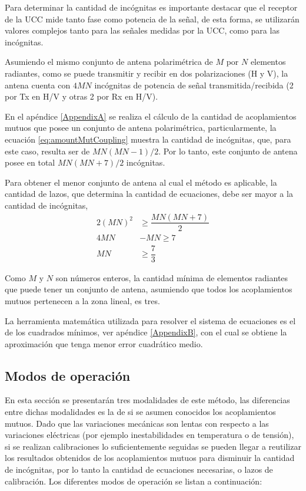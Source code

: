 Para determinar la cantidad de incógnitas es importante destacar que el receptor de la UCC mide tanto fase como potencia de la
señal, de esta forma, se utilizarán valores complejos tanto para las señales medidas por la UCC, como para las incógnitas.

Asumiendo el mismo conjunto de antena polarimétrica de $M$ por $N$ elementos radiantes, como se puede transmitir y recibir en
dos polarizaciones (H y V), la antena cuenta con $4MN$ incógnitas de potencia de señal transmitida/recibida (2 por Tx en H/V y
otras 2 por Rx en H/V).

En el apéndice \ref{AppendixA} se realiza el cálculo de la cantidad de acoplamientos mutuos que posee un conjunto de antena
polarimétrica, particularmente, la ecuación \ref{eq:amountMutCoupling} muestra la cantidad de incógnitas, que, para este caso,
resulta ser de $MN(MN-1)/2$. Por lo tanto, este conjunto de antena posee en total $MN(MN + 7)/2$ incógnitas.

Para obtener el menor conjunto de antena al cual el método es aplicable, la cantidad de lazos, que determina la cantidad de
ecuaciones, debe ser mayor a la cantidad de incógnitas, 
$$
\begin{aligned}
	2(MN)^2 &\ge  \dfrac{MN(MN + 7)}{2} \\
	4MN &- MN \ge7 \\
	MN &\ge \dfrac{7}{3}
\end{aligned}
$$

Como $M$ y $N$ son números enteros, la cantidad mínima de elementos radiantes que puede tener un conjunto de antena, asumiendo
que todos los acoplamientos mutuos pertenecen a la zona lineal, es tres.

La herramienta matemática utilizada para resolver el sistema de ecuaciones es el de los cuadrados mínimos,
ver apéndice \ref{AppendixB}, con el cual se obtiene la aproximación que tenga menor error cuadrático medio.


\subsection{Modos de operación}
\label{ssc:operationalModes}

En esta sección se presentarán tres modalidades de este método, las diferencias entre dichas modalidades es la de si se asumen
conocidos los acoplamientos mutuos. Dado que las variaciones mecánicas son lentas con respecto a las variaciones eléctricas
(por ejemplo inestabilidades en temperatura o de tensión), si se realizan calibraciones lo suficientemente seguidas se pueden
llegar a reutilizar los resultados obtenidos de los acoplamientos mutuos para disminuir la cantidad de incógnitas, por lo tanto
la cantidad de ecuaciones necesarias, o lazos de calibración. Los diferentes modos de operación se listan a continuación:

